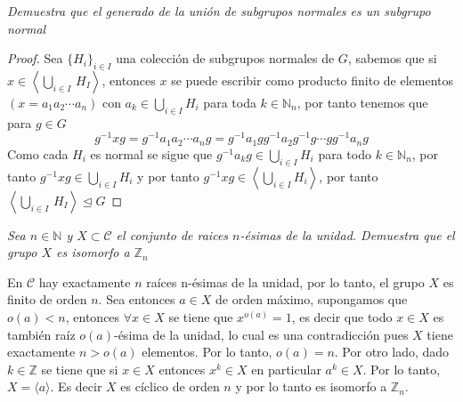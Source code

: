\documentclass[11pt,letterpaper]{article}
\newcommand{\C}{\mathcal{C}}
\newcommand{\N}{\mathbb{N}}
\newcommand{\Z}{\mathbb{Z}}
\begin{document}
\newpage

\begin{tcolorbox}[
	title = \textcolor{black}{\textcolor{white}{Problema 7}},]
\textit{Demuestra que el generado de la uni\'on de subgrupos normales es un subgrupo normal }
\end{tcolorbox}
\begin{proof}
    Sea $\{H_i\}_{i\in I}$ una colecci\'on de subgrupos normales de $G$, sabemos que si $x\in\left\langle \displaystyle\bigcup_{i\in I}\,H_I\right\rangle$, entonces $x$ se puede escribir como producto finito de elementos $(x=a_1a_2\cdots a_n)$ con $a_k\in \displaystyle\bigcup_{i\in I}H_i$ para toda $k\in \N_n$, por tanto tenemos que para $g\in G$
    \begin{equation*}
        g^{-1}xg=g^{-1}a_1a_2\cdots a_ng=g^{-1}a_1gg^{-1}a_2g^{-1}g\cdots gg^{-1}a_ng
    \end{equation*}
    Como cada $H_i$ es normal se sigue que $g^{-1}a_kg\in \displaystyle\bigcup_{i\in I}H_i$ para todo $k\in \N_n$, por tanto $g^{-1}xg\in \displaystyle\bigcup_{i\in I}H_i$ y por tanto $g^{-1}xg\in\left\langle \displaystyle\bigcup_{i\in I}H_i\right\rangle$, por tanto $\left\langle\displaystyle\bigcup_{i\in I}\,H_I\right\rangle\trianglelefteq G$
\end{proof}

\begin{tcolorbox}[
	title = \textcolor{black}{\textcolor{white}{Problema 8}},]
\textit{Sea $n\in \N$ y $X\subset \C$ el conjunto de raices $n$-\'esimas de la unidad. Demuestra que el grupo $X$ es isomorfo a $\Z_n$}
\end{tcolorbox}
\begin{Solucion}
    En \(\C\) hay exactamente \(n\) ra\'ices n-\'esimas de la unidad, por lo tanto, el grupo \(X\) es finito de orden \(n\). 
    Sea entonces \(a\in X\) de orden máximo, supongamos que \(o(a)<n\), entonces \(\forall x \in X\) se tiene que \(x^{o(a)}=1\), es decir que todo \(x\in X\) es 
    también raíz \(o(a)\)-ésima de la unidad, lo cual es una contradicción pues \(X\) tiene exactamente \(n>o(a)\) elementos. Por lo tanto, \(o(a)=n\). Por otro lado,
    dado \(k \in \Z\) se tiene que si \(x\in X\) entonces \(x^k\in X\) en particular \(a^k \in X\). Por lo tanto, \(X=\langle a \rangle\). 
    Es decir \(X\) es cíclico de orden \(n\) y por lo tanto es isomorfo a \(\Z_n\).
\end{Solucion}
\end{document}
